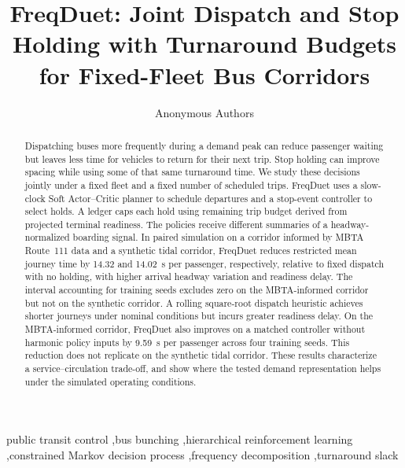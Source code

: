 \documentclass[preprint,12pt,authoryear,nopreprintline]{elsarticle}
\begin{document}
\begin{frontmatter}

\title{FreqDuet: Joint Dispatch and Stop Holding with Turnaround Budgets for Fixed-Fleet Bus Corridors}

\author[aff1]{Anonymous Authors}
\address[aff1]{Submitted to Transportation Research Part C: Emerging Technologies}

\begin{abstract}
Dispatching buses more frequently during a demand peak can reduce passenger waiting but leaves less time for vehicles to return for their next trip. Stop holding can improve spacing while using some of that same turnaround time. We study these decisions jointly under a fixed fleet and a fixed number of scheduled trips. FreqDuet uses a slow-clock Soft Actor--Critic planner to schedule departures and a stop-event controller to select holds. A ledger caps each hold using remaining trip budget derived from projected terminal readiness. The policies receive different summaries of a headway-normalized boarding signal. In paired simulation on a corridor informed by MBTA Route~111 data and a synthetic tidal corridor, FreqDuet reduces restricted mean journey time by 14.32 and 14.02~s per passenger, respectively, relative to fixed dispatch with no holding, with higher arrival headway variation and readiness delay. The interval accounting for training seeds excludes zero on the MBTA-informed corridor but not on the synthetic corridor. A rolling square-root dispatch heuristic achieves shorter journeys under nominal conditions but incurs greater readiness delay. On the MBTA-informed corridor, FreqDuet also improves on a matched controller without harmonic policy inputs by 9.59~s per passenger across four training seeds. This reduction does not replicate on the synthetic tidal corridor. These results characterize a service--circulation trade-off, and show where the tested demand representation helps under the simulated operating conditions.
\end{abstract}

\begin{keyword}
public transit control \sep bus bunching \sep hierarchical reinforcement learning \sep constrained Markov decision process \sep frequency decomposition \sep turnaround slack
\end{keyword}

\end{frontmatter}











\end{document}
